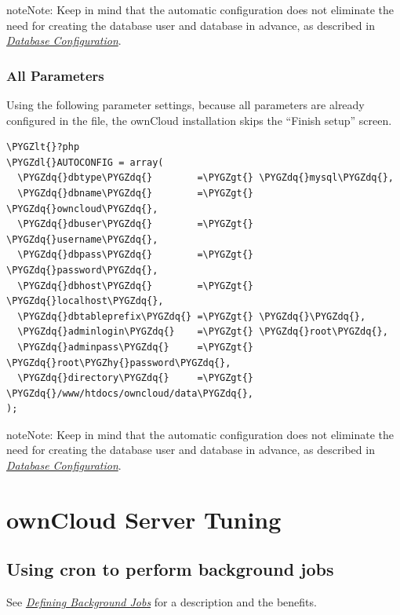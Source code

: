 \documentclass[letterpaper,10pt,english]{sphinxmanual}
\def\PYGZlt{\char`\<}
\def\PYGZgt{\char`\>}
\def\PYGZdl{\char`\$}
\def\PYGZhy{\char`\-}
\def\PYGZdq{\char`\"}
\begin{document}
\begin{notice}{note}{Note:}
Keep in mind that the automatic configuration does not eliminate the need for
creating the database user and database in advance, as described in
{\hyperref[configuration_database/linux_database_configuration::doc]{\emph{\emph{Database Configuration}}}}.
\end{notice}


\subsubsection{All Parameters}
\label{configuration_server/automatic_configuration:all-parameters}
Using the following parameter settings, because all parameters are already configured in the file, the ownCloud installation skips the ``Finish setup'' screen.

\begin{Verbatim}[commandchars=\\\{\}]
\PYGZlt{}?php
\PYGZdl{}AUTOCONFIG = array(
  \PYGZdq{}dbtype\PYGZdq{}        =\PYGZgt{} \PYGZdq{}mysql\PYGZdq{},
  \PYGZdq{}dbname\PYGZdq{}        =\PYGZgt{} \PYGZdq{}owncloud\PYGZdq{},
  \PYGZdq{}dbuser\PYGZdq{}        =\PYGZgt{} \PYGZdq{}username\PYGZdq{},
  \PYGZdq{}dbpass\PYGZdq{}        =\PYGZgt{} \PYGZdq{}password\PYGZdq{},
  \PYGZdq{}dbhost\PYGZdq{}        =\PYGZgt{} \PYGZdq{}localhost\PYGZdq{},
  \PYGZdq{}dbtableprefix\PYGZdq{} =\PYGZgt{} \PYGZdq{}\PYGZdq{},
  \PYGZdq{}adminlogin\PYGZdq{}    =\PYGZgt{} \PYGZdq{}root\PYGZdq{},
  \PYGZdq{}adminpass\PYGZdq{}     =\PYGZgt{} \PYGZdq{}root\PYGZhy{}password\PYGZdq{},
  \PYGZdq{}directory\PYGZdq{}     =\PYGZgt{} \PYGZdq{}/www/htdocs/owncloud/data\PYGZdq{},
);
\end{Verbatim}

\begin{notice}{note}{Note:}
Keep in mind that the automatic configuration does not eliminate the need for
creating the database user and database in advance, as described in
{\hyperref[configuration_database/linux_database_configuration::doc]{\emph{\emph{Database Configuration}}}}.
\end{notice}


\section{ownCloud Server Tuning}
\label{configuration_server/oc_server_tuning::doc}\label{configuration_server/oc_server_tuning:owncloud-server-tuning}

\subsection{Using cron to perform background jobs}
\label{configuration_server/oc_server_tuning:using-cron-to-perform-background-jobs}
See {\hyperref[configuration_server/background_jobs_configuration::doc]{\emph{\emph{Defining Background Jobs}}}} for a description and the
benefits.
\end{document}
